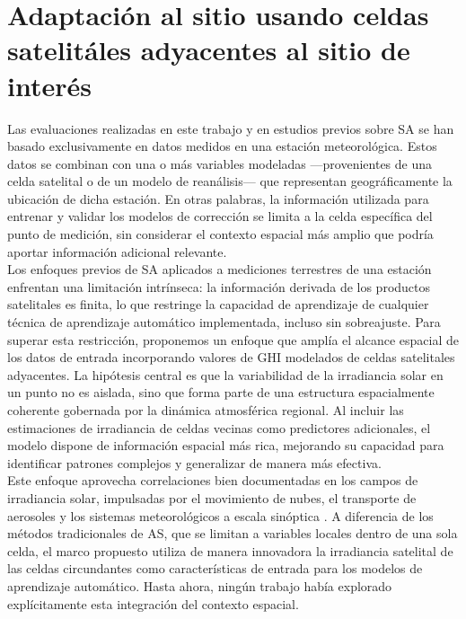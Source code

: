 \section{Adaptación al sitio usando celdas satelitáles adyacentes al sitio de interés}
Las evaluaciones realizadas en este trabajo y en estudios previos sobre SA se han basado exclusivamente en datos medidos en una estación meteorológica. Estos datos se combinan con una o más variables modeladas —provenientes de una celda satelital o de un modelo de reanálisis— que representan geográficamente la ubicación de dicha estación. En otras palabras, la información utilizada para entrenar y validar los modelos de corrección se limita a la celda específica del punto de medición, sin considerar el contexto espacial más amplio que podría aportar información adicional relevante.\\

Los enfoques previos de SA aplicados a mediciones terrestres de una estación enfrentan una limitación intrínseca: la información derivada de los productos satelitales es finita, lo que restringe la capacidad de aprendizaje de cualquier técnica de aprendizaje automático implementada, incluso sin sobreajuste. Para superar esta restricción, proponemos un enfoque que amplía el alcance espacial de los datos de entrada incorporando valores de GHI modelados de celdas satelitales adyacentes. La hipótesis central es que la variabilidad de la irradiancia solar en un punto no es aislada, sino que forma parte de una estructura espacialmente coherente gobernada por la dinámica atmosférica regional. Al incluir las estimaciones de irradiancia de celdas vecinas como predictores adicionales, el modelo dispone de información espacial más rica, mejorando su capacidad para identificar patrones complejos y generalizar de manera más efectiva.\\

Este enfoque aprovecha correlaciones bien documentadas en los campos de irradiancia solar, impulsadas por el movimiento de nubes, el transporte de aerosoles y los sistemas meteorológicos a escala sinóptica \citep{IHSAN2024}. A diferencia de los métodos tradicionales de AS, que se limitan a variables locales dentro de una sola celda, el marco propuesto utiliza de manera innovadora la irradiancia satelital de las celdas circundantes como características de entrada para los modelos de aprendizaje automático. Hasta ahora, ningún trabajo había explorado explícitamente esta integración del contexto espacial.



